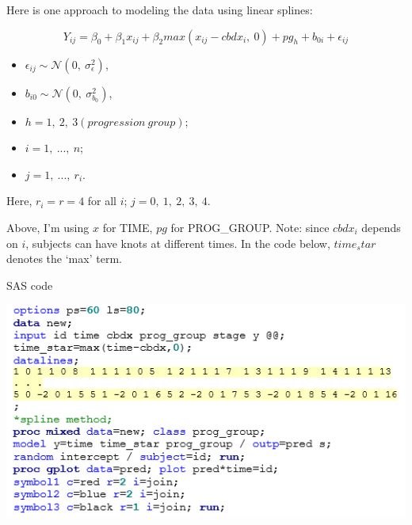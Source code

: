 \documentclass[
  9pt,
  ignorenonframetext,
]{beamer}
\providecommand{\tightlist}{%
  \setlength{\itemsep}{0pt}\setlength{\parskip}{0pt}}
\begin{document}
\begin{frame}{}
\protect\hypertarget{section-3}{}
Here is one approach to modeling the data using linear splines:

\[Y_{ij}=\beta_0+\beta_1 x_{ij}+\beta_2 max(x_{ij}-cbdx_i,\ 0)+ pg_h + b_{0i} + \epsilon_{ij}\]

\begin{itemize}
\tightlist
\item
  \(\epsilon_{ij}\sim \mathcal N(0,\  \sigma_\epsilon^2)\),
\item
  \(b_{i0}\sim \mathcal N(0,\  \sigma_{b_0}^2)\),
\item
  \(h=1,\ 2,\ 3 (progression\ group)\);
\item
  \(i=1,\ ... ,\ n\);
\item
  \(j=1,\ ... ,\ r_i\).
\end{itemize}

Here, \(r_i=r=4\) for all \(i\); \(j=0,\ 1,\ 2,\ 3,\ 4\).

Above, I'm using \(x\) for TIME, \(pg\) for PROG\_GROUP. Note: since
\(cbd x_i\) depends on \(i\), subjects can have knots at different
times. In the code below, \(time_star\) denotes the `max' term.
\end{frame}

\begin{frame}{SAS code}
\protect\hypertarget{sas-code}{}
\begin{center}\includegraphics[width=0.7\linewidth]{figs_L12/f2} \end{center}
\end{frame}
\end{document}
